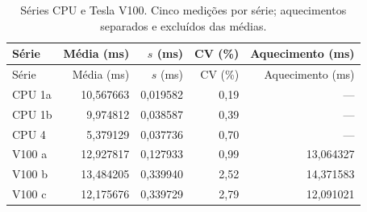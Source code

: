 \begin{longtable}{lrrrr}
\caption{Séries CPU e Tesla V100. Cinco medições por série; aquecimentos separados e excluídos das médias.}\label{tab:resumo}\\
\toprule Série & Média (ms) & $s$ (ms) & CV (\%) & Aquecimento (ms)\\
\midrule\endfirsthead
\toprule Série & Média (ms) & $s$ (ms) & CV (\%) & Aquecimento (ms)\\
\midrule\endhead
\bottomrule\endfoot
CPU 1a & 10,567663 & 0,019582 & 0,19 & ---\\
CPU 1b & 9,974812 & 0,038587 & 0,39 & ---\\
CPU 4 & 5,379129 & 0,037736 & 0,70 & ---\\
V100 a & 12,927817 & 0,127933 & 0,99 & 13,064327\\
V100 b & 13,484205 & 0,339940 & 2,52 & 14,371583\\
V100 c & 12,175676 & 0,339729 & 2,79 & 12,091021\\
\end{longtable}

